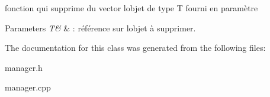 fonction qui supprime du vector l\textquotesingle{}objet de type T fourni en paramètre 


\begin{DoxyParams}{Parameters}
{\em T\&} & \+: référence sur l\textquotesingle{}objet à supprimer. \\
\hline
\end{DoxyParams}


The documentation for this class was generated from the following files\+:\begin{DoxyCompactItemize}
\item 
manager.\+h\item 
manager.\+cpp\end{DoxyCompactItemize}
